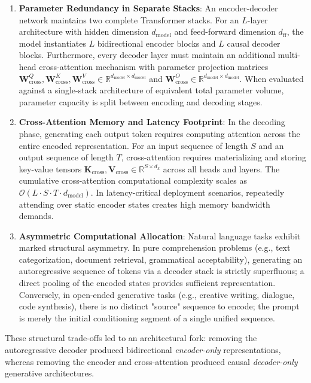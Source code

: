 \documentclass[../../../main.tex]{subfiles}
\begin{document}
\begin{enumerate}
    \item \textbf{Parameter Redundancy in Separate Stacks}: An encoder-decoder network maintains two complete Transformer stacks. For an $L$-layer architecture with hidden dimension $d_{\text{model}}$ and feed-forward dimension $d_{\text{ff}}$, the model instantiates $L$ bidirectional encoder blocks and $L$ causal decoder blocks. Furthermore, every decoder layer must maintain an additional multi-head cross-attention mechanism with parameter projection matrices $\mathbf{W}^Q_{\text{cross}}, \mathbf{W}^K_{\text{cross}}, \mathbf{W}^V_{\text{cross}} \in \mathbb{R}^{d_{\text{model}} \times d_{\text{model}}}$ and $\mathbf{W}^O_{\text{cross}} \in \mathbb{R}^{d_{\text{model}} \times d_{\text{model}}}$. When evaluated against a single-stack architecture of equivalent total parameter volume, parameter capacity is split between encoding and decoding stages.
    
    \item \textbf{Cross-Attention Memory and Latency Footprint}: In the decoding phase, generating each output token requires computing attention across the entire encoded representation. For an input sequence of length $S$ and an output sequence of length $T$, cross-attention requires materializing and storing key-value tensors $\mathbf{K}_{\text{cross}}, \mathbf{V}_{\text{cross}} \in \mathbb{R}^{S \times d_k}$ across all heads and layers. The cumulative cross-attention computational complexity scales as $\mathcal{O}(L \cdot S \cdot T \cdot d_{\text{model}})$. In latency-critical deployment scenarios, repeatedly attending over static encoder states creates high memory bandwidth demands.
    
    \item \textbf{Asymmetric Computational Allocation}: Natural language tasks exhibit marked structural asymmetry. In pure comprehension problems (e.g., text categorization, document retrieval, grammatical acceptability), generating an autoregressive sequence of tokens via a decoder stack is strictly superfluous; a direct pooling of the encoded states provides sufficient representation. Conversely, in open-ended generative tasks (e.g., creative writing, dialogue, code synthesis), there is no distinct "source" sequence to encode; the prompt is merely the initial conditioning segment of a single unified sequence.
\end{enumerate}

These structural trade-offs led to an architectural fork: removing the autoregressive decoder produced bidirectional \emph{encoder-only} representations, whereas removing the encoder and cross-attention produced causal \emph{decoder-only} generative architectures.
\end{document}
